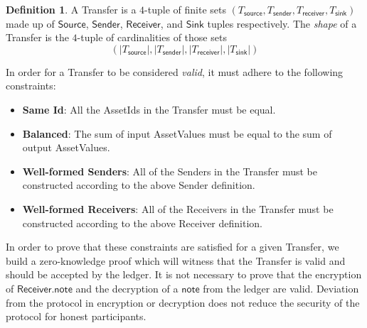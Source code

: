 \documentclass[a4paper]{article}
\theoremstyle{definition}
\newtheorem{definition}{Definition}[subsection]
\renewcommand{\abs}[1]{\left|#1\right|}
\newcommand{\AssetId}{{\textsf{AssetId}}}
\newcommand{\AssetValue}{{\textsf{AssetValue}}}
\newcommand{\Receiver}{{\textsf{Receiver}}}
\newcommand{\Sender}{{\textsf{Sender}}}
\newcommand{\Sink}{{\textsf{Sink}}}
\newcommand{\Source}{{\textsf{Source}}}
\newcommand{\Transfer}{{\textsf{Transfer}}}
\newcommand{\note}{{\textsf{note}}}
\newcommand{\receiver}{{\textsf{receiver}}}
\newcommand{\sender}{{\textsf{sender}}}
\newcommand{\sink}{{\textsf{sink}}}
\newcommand{\source}{{\textsf{source}}}
\begin{document}
\begin{definition}
    A \Transfer{} is a $4$-tuple of finite sets $(T_\source, T_\sender, T_\receiver, T_\sink)$ made up of $\Source$, $\Sender$, $\Receiver$, and $\Sink$ tuples respectively. The \emph{shape} of a \Transfer{} is the $4$-tuple of cardinalities of those sets
    \[\left(\abs{T_\source}, \abs{T_\sender}, \abs{T_\receiver}, \abs{T_\sink}\right)\]
\end{definition}

In order for a \Transfer{} to be considered \emph{valid}, it must adhere to the following constraints:

\begin{itemize}
    \item \textbf{Same Id}: All the \AssetId{s} in the \Transfer{} must be equal.
    \item \textbf{Balanced}: The sum of input \AssetValue{s} must be equal to the sum of output \AssetValue{s}.
    \item \textbf{Well-formed Senders}: All of the \Sender{s} in the \Transfer{} must be constructed according to the above \Sender{} definition.
    \item \textbf{Well-formed Receivers}: All of the \Receiver{s} in the \Transfer{} must be constructed according to the above \Receiver{} definition.
\end{itemize}

In order to prove that these constraints are satisfied for a given \Transfer{}, we build a zero-knowledge proof which will witness that the \Transfer{} is valid and should be accepted by the ledger. It is not necessary to prove that the encryption of $\Receiver.\note$ and the decryption of a $\note$ from the ledger are valid. Deviation from the protocol in encryption or decryption does not reduce the security of the protocol for honest participants.
\end{document}
